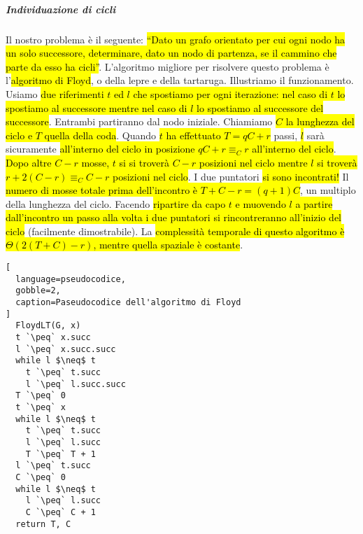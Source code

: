 \documentclass[a4paper,11pt,oneside]{article}
\theoremstyle{plain}
\theoremstyle{definition}
\theoremstyle{remark}
\newcommand{\peq}{$\gets$}
\begin{document}
\subparagraph{Individuazione di cicli} Il nostro problema è il seguente:
\hl{``Dato un grafo orientato per cui ogni nodo ha un solo successore,
determinare, dato un nodo di partenza, se il cammino che parte da esso ha
cicli''}. L'algoritmo migliore per risolvere questo problema è l'\hl{algoritmo
di Floyd}, o della lepre e della tartaruga. Illustriamo il funzionamento. Usiamo
\hl{due riferimenti $t$ ed $l$ che spostiamo per ogni iterazione: nel caso di
$t$ lo spostiamo al successore mentre nel caso di $l$ lo spostiamo al successore
del successore}. Entrambi partiranno dal nodo iniziale. Chiamiamo \hl{$C$ la
lunghezza del ciclo e $T$ quella della coda}. Quando \hl{$t$ ha effettuato $T =
qC + r$} passi, \hl{$l$} sarà sicuramente \hl{all'interno del ciclo in posizione
$qC + r \equiv_C r$ all'interno del ciclo}. \hl{Dopo altre $C-r$ mosse, $t$ si
si troverà $C-r$ posizioni nel ciclo mentre $l$ si troverà $r + 2(C-r) \equiv_C
C-r$ posizioni nel ciclo}. I due puntatori \hl{si sono incontrati!} Il
\hl{numero di mosse totale prima dell'incontro è $T+C-r=(q+1)C$}, un multiplo
della lunghezza del ciclo. Facendo \hl{ripartire da capo $t$ e muovendo $l$ a
partire dall'incontro un passo alla volta i due puntatori si rincontreranno
all'inizio del ciclo} (facilmente dimostrabile). La \hl{complessità temporale di
questo algoritmo è $\Theta(2(T+C)-r)$, mentre quella spaziale è costante}.

\begin{lstlisting}[
  language=pseudocodice,
  gobble=2,
  caption=Paseudocodice dell'algoritmo di Floyd
]
  FloydLT(G, x)
  t `\peq` x.succ
  l `\peq` x.succ.succ
  while l $\neq$ t
    t `\peq` t.succ
    l `\peq` l.succ.succ
  T `\peq` 0
  t `\peq` x
  while l $\neq$ t
    t `\peq` t.succ
    l `\peq` l.succ
    T `\peq` T + 1
  l `\peq` t.succ
  C `\peq` 0
  while l $\neq$ t
    l `\peq` l.succ
    C `\peq` C + 1
  return T, C
\end{lstlisting}
\end{document}
